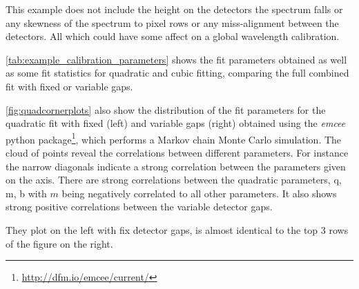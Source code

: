 This example does not include the height on the detectors the spectrum falls or any skewness of the spectrum to pixel rows or any miss-alignment between the detectors. All which could have some affect on a global wavelength calibration.

\cref{tab:example_calibration_parameters} shows the fit parameters obtained as well as some fit statistics for quadratic and cubic fitting, comparing the full combined fit with fixed or variable gaps. 

\cref{fig:quadcornerplots} also show the distribution of the fit parameters for the quadratic fit with fixed (left) and variable gaps (right) obtained using the \textit{emcee} python package\footnote{\href{http://dfm.io/emcee/current/}{http://dfm.io/emcee/current/}}, which performs a Markov chain Monte Carlo simulation.
The cloud of points reveal the correlations between different parameters.
For instance the narrow diagonals indicate a strong correlation between the parameters given on the axis.
There are strong correlations between the quadratic parameters, {q, m, b} with $m$ being negatively correlated to all other parameters.
It also shows strong positive correlations between the variable detector gaps.

They plot on the left with fix detector gaps, is almost identical to the top 3 rows of the figure on the right.




